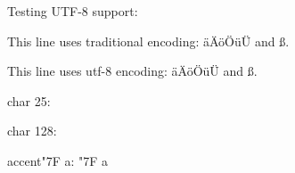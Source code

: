 Testing UTF-8 support:

This line uses traditional encoding: \"a\"A\"o\"O\"u\"U and \ss.

This line uses utf-8 encoding: äÄöÖüÜ and ß. 

char 25: 

char 128: 

accent"7F a: \accent"7F a
\bye
